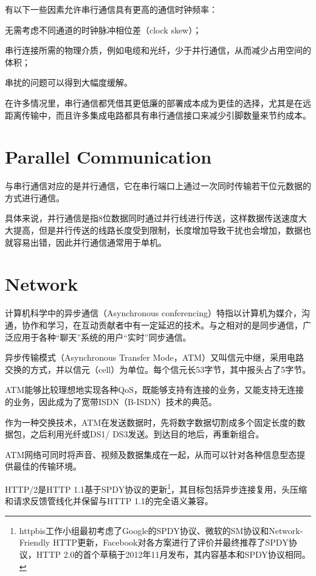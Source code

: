 有以下一些因素允许串行通信具有更高的通信时钟频率：

\begin{compactitem}
\item 无需考虑不同通道的时钟脉冲相位差（clock skew）；
\item 串行连接所需的物理介质，例如电缆和光纤，少于并行通信，从而减少占用空间的体积；
\item 串扰的问题可以得到大幅度缓解。
\end{compactitem}

在许多情况里，串行通信都凭借其更低廉的部署成本成为更佳的选择，尤其是在远距离传输中，而且许多集成电路都具有串行通信接口来减少引脚数量来节约成本。





\section{Parallel Communication}

与串行通信对应的是并行通信，它在串行端口上通过一次同时传输若干位元数据的方式进行通信。

具体来说，并行通信是指8位数据同时通过并行线进行传送，这样数据传送速度大大提高，但是并行传送的线路长度受到限制，长度增加导致干扰也会增加，数据也就容易出错，因此并行通信通常用于单机。



\section{Network}

计算机科学中的异步通信（Asynchronous conferencing）特指以计算机为媒介，沟通，协作和学习，在互动贡献者中有一定延迟的技术。与之相对的是同步通信，广泛应用于各种“聊天”系统的用户“实时”同步通信。


异步传输模式（Asynchronous Transfer Mode，ATM）又叫信元中继，采用电路交换的方式，并以信元（cell）为单位。每个信元长53字节，其中报头占了5字节。

ATM能够比较理想地实现各种QoS，既能够支持有连接的业务，又能支持无连接的业务，因此成为了宽带ISDN（B-ISDN）技术的典范。

作为一种交换技术，ATM在发送数据时，先将数字数据切割成多个固定长度的数据包，之后利用光纤或DS1/ DS3发送。到达目的地后，再重新组合。

ATM网络可同时将声音、视频及数据集成在一起，从而可以针对各种信息型态提供最佳的传输环境。

HTTP/2是HTTP 1.1基于SPDY协议的更新\footnote{httpbis工作小组最初考虑了Google的SPDY协议、微软的SM协议和Network-Friendly HTTP更新，Facebook对各方案进行了评价并最终推荐了SPDY协议，HTTP 2.0的首个草稿于2012年11月发布，其内容基本和SPDY协议相同。}，其目标包括异步连接复用，头压缩和请求反馈管线化并保留与HTTP 1.1的完全语义兼容。


